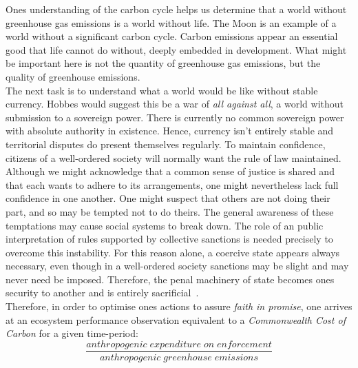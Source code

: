 \documentclass[11pt, oneside]{article}   	%
\begin{document}
Ones understanding of the carbon cycle helps us determine that a world without greenhouse gas emissions is a world without life.
The Moon is an example of a world without a significant carbon cycle.
Carbon emissions appear an essential good that life cannot do without, deeply embedded in development.
What might be important here is not the quantity of greenhouse gas emissions, but the quality of greenhouse emissions.\\

The next task is to understand what a world would be like without stable currency.
Hobbes would suggest this be a war of \emph{all against all}, a world without submission to a sovereign power.
There is currently no common sovereign power with absolute authority in existence.
Hence, currency isn't entirely stable and territorial disputes do present themselves regularly.
To maintain confidence, citizens of a well-ordered society will normally want the rule of law maintained.
Although we might acknowledge that a common sense of justice is shared and that each wants to adhere to its arrangements, one might nevertheless lack full confidence in one another.
One might suspect that others are not doing their part, and so may be tempted not to do theirs.
The general awareness of these temptations may cause social systems to break down.
The role of an public interpretation of rules supported by collective sanctions is needed precisely to overcome this instability.
For this reason alone, a coercive state appears always necessary, even though in a well-ordered society sanctions may be slight and may never need be imposed.
Therefore, the penal machinery of state becomes ones security to another and is entirely sacrificial~\cite{jr1}.\\

Therefore, in order to optimise ones actions to assure \emph{faith in promise}, one arrives at an ecosystem performance observation equivalent to a \emph{Commonwealth Cost of Carbon} for a given time-period:\\

\begin{equation}
	\frac{anthropogenic\; expenditure\; on\; enforcement}{anthropogenic\; greenhouse\; emissions}
\end{equation}
\end{document}
